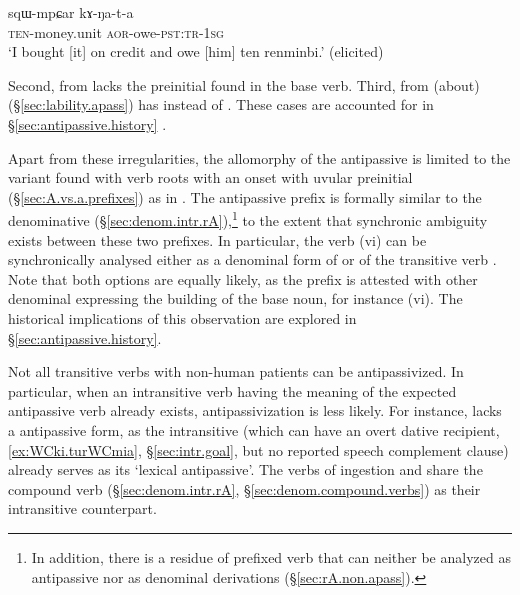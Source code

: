\begin{exe}
\ex \label{ex:sqWmpCar.kANata}
\gll sqɯ-mpɕar kɤ-ŋa-t-a \\
\textsc{ten}-money.unit \textsc{aor}-owe-\textsc{pst}:\textsc{tr}-\textsc{1sg} \\
\glt `I bought [it] on credit and owe [him] ten renminbi.' (elicited)
\end{exe}

Second,   from  lacks the  preinitial found in the base verb. Third,  from  (about)  (§\ref{sec:lability.apass}) has  instead of . These cases are accounted for in §\ref{sec:antipassive.history} .
 
Apart from these irregularities, the allomorphy of the  antipassive is limited to the variant  found with verb roots with an onset with uvular preinitial (§\ref{sec:A.vs.a.prefixes}) as in . The antipassive  prefix is formally similar to the denominative  (§\ref{sec:denom.intr.rA}),\footnote{In addition, there is a residue of  prefixed verb that can neither be analyzed as antipassive nor as denominal derivations (§\ref{sec:rA.non.apass}). } to the extent that synchronic ambiguity exists between these two prefixes. In particular, the verb  (vi) can be synchronically analysed either as a denominal form of  or of the transitive verb .  Note that both options are equally likely, as the prefix  is attested with other denominal expressing the building of the base noun, for instance  \fl{}  (vi). The historical implications of this observation are explored in §\ref{sec:antipassive.history}.  
 
Not all transitive verbs with non-human patients can be antipassivized. In particular, when an intransitive verb having the meaning of the expected antipassive verb already exists, antipassivization is less likely. For instance,  lacks a  antipassive form, as the intransitive  (which can have an overt dative recipient, \ref{ex:WCki.turWCmia}, §\ref{sec:intr.goal}, but no reported speech complement clause) already serves as its `lexical antipassive'. The verbs of ingestion  and  share the compound verb  (§\ref{sec:denom.intr.rA}, §\ref{sec:denom.compound.verbs}) as their intransitive counterpart.

